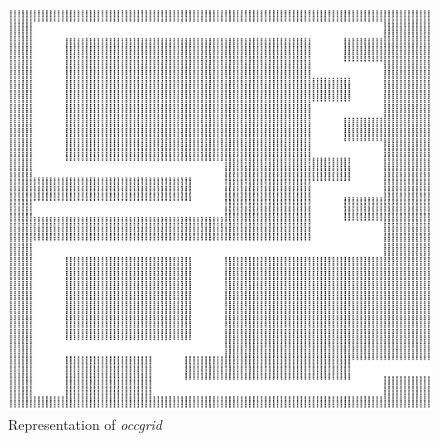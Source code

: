 \documentclass{article}
\begin{document}
\begin{figure}
	\begin{center}
	\includegraphics[width=\textwidth]{graphics/world.eps}
	\end{center}
	\caption{Representation of \emph{occgrid}}
	\label{fig:occgrid}
\end{figure}
\end{document}
